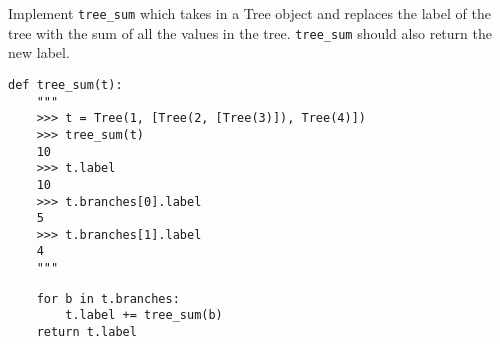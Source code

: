 \begin{blocksection}
\question Implement \lstinline$tree_sum$ which takes in a Tree
object and replaces the label of the tree with the sum of all the values
in the tree. \lstinline$tree_sum$ should also return the new label.

\begin{lstlisting}
def tree_sum(t):
    """
    >>> t = Tree(1, [Tree(2, [Tree(3)]), Tree(4)])
    >>> tree_sum(t)
    10
    >>> t.label
    10
    >>> t.branches[0].label
    5
    >>> t.branches[1].label
    4
    """
\end{lstlisting}

\begin{solution}[1in]
\begin{lstlisting}
    for b in t.branches:
        t.label += tree_sum(b)
    return t.label
\end{lstlisting}
\end{solution}
\end{blocksection}

